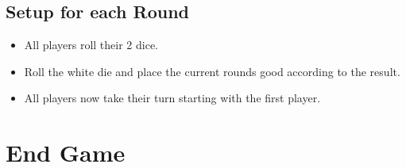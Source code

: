 \documentclass[12pt]{article}
\newenvironment{itemizeCustom}
{\begin{itemize}
  \setlength{\itemsep}{1pt}
  \setlength{\parskip}{0pt}
  \setlength{\parsep}{0pt}}
{\end{itemize}}
\begin{document}
\begin{mdframed}[style = customFrame]
\begin{multicols*}{2}
\subsection*{Setup for each Round}
\begin{itemizeCustom}
	\item All players roll their 2 dice.
	\item Roll the white die and place the current rounds good according to the result.
	\item All players now take their turn starting with the first player.
\end{itemizeCustom}
\section*{End Game}

\end{multicols*}
\end{mdframed}
\end{document}
